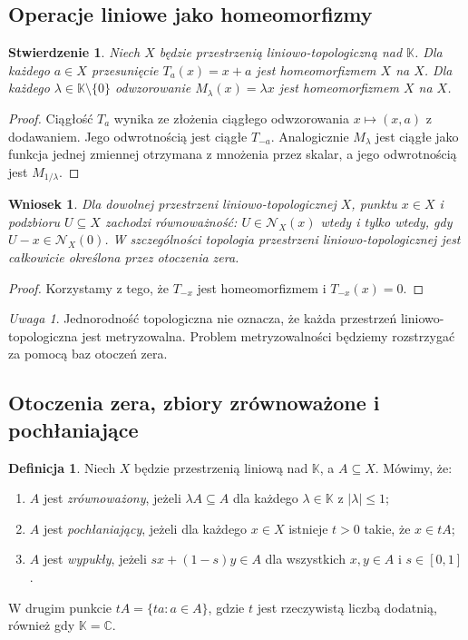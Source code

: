 \documentclass[11pt,a4paper]{article}
\numberwithin{equation}{section}
\theoremstyle{plain}
\newtheorem{stwierdzenie}[twierdzenie]{Stwierdzenie}
\newtheorem{wniosek}[twierdzenie]{Wniosek}
\theoremstyle{definition}
\newtheorem{definicja}[twierdzenie]{Definicja}
\theoremstyle{remark}
\newtheorem{uwaga}[twierdzenie]{Uwaga}
\newcommand{\C}{\mathbb C}
\newcommand{\K}{\mathbb K}
\begin{document}
\subsection{Operacje liniowe jako homeomorfizmy}

\begin{stwierdzenie}\label{prop:translation}
Niech $X$ będzie przestrzenią liniowo-topologiczną nad $\K$.
Dla każdego $a\in X$ przesunięcie $T_a(x)=x+a$ jest
homeomorfizmem $X$ na $X$. Dla każdego $\lambda\in\K\setminus\{0\}$
odwzorowanie $M_\lambda(x)=\lambda x$ jest homeomorfizmem $X$ na $X$.
\end{stwierdzenie}
\begin{proof}
Ciągłość $T_a$ wynika ze złożenia ciągłego odwzorowania
$x\mapsto(x,a)$ z dodawaniem. Jego odwrotnością jest ciągłe $T_{-a}$.
Analogicznie $M_\lambda$ jest ciągłe jako funkcja jednej zmiennej
otrzymana z mnożenia przez skalar, a jego odwrotnością jest
$M_{1/\lambda}$.
\end{proof}

\begin{wniosek}\label{cor:zero-neighborhood}
Dla dowolnej przestrzeni liniowo-topologicznej $X$, punktu $x\in X$
i podzbioru $U\subseteq X$ zachodzi równoważność:
$U\in\mathcal N_X(x)$ wtedy i tylko wtedy, gdy
$U-x\in\mathcal N_X(0)$. W szczególności topologia przestrzeni
liniowo-topologicznej jest całkowicie określona przez otoczenia zera.
\end{wniosek}
\begin{proof}
Korzystamy z tego, że $T_{-x}$ jest homeomorfizmem i
$T_{-x}(x)=0$.
\end{proof}

\begin{uwaga}
Jednorodność topologiczna nie oznacza, że każda przestrzeń
liniowo-topologiczna jest metryzowalna. Problem metryzowalności
będziemy rozstrzygać za pomocą baz otoczeń zera.
\end{uwaga}

\subsection{Otoczenia zera, zbiory zrównoważone i pochłaniające}

\begin{definicja}\label{def:balanced-absorbing}
Niech $X$ będzie przestrzenią liniową nad $\K$, a $A\subseteq X$.
Mówimy, że:
\begin{enumerate}[label=\textup{(\roman*)}]
 \item $A$ jest \emph{zrównoważony}, jeżeli $\lambda A\subseteq A$
       dla każdego $\lambda\in\K$ z $|\lambda|\leq1$;
 \item $A$ jest \emph{pochłaniający}, jeżeli dla każdego $x\in X$
       istnieje $t>0$ takie, że $x\in tA$;
 \item $A$ jest \emph{wypukły}, jeżeli $sx+(1-s)y\in A$
       dla wszystkich $x,y\in A$ i $s\in[0,1]$.
\end{enumerate}
W drugim punkcie $tA=\{ta:a\in A\}$, gdzie $t$ jest rzeczywistą
liczbą dodatnią, również gdy $\K=\C$.
\end{definicja}
\end{document}
